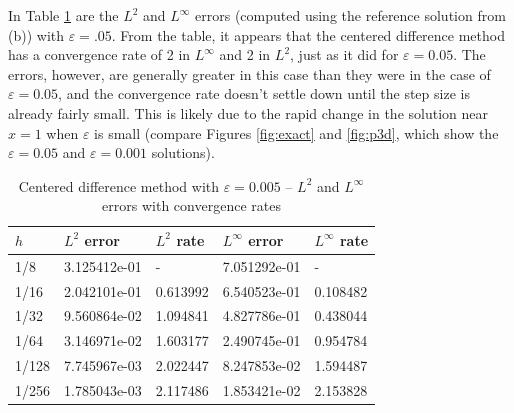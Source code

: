 \documentclass{homework}
\begin{document}
\begin{alphaparts}
		\questionpart In Table \ref{tab:p3e} are the $L^2$ and $L^\infty$ errors (computed using the reference solution from (b)) with $\varepsilon = .05$. From the table, it appears that the centered difference method has a convergence rate of 2 in $L^\infty$ and 2 in $L^2$, just as it did for $\varepsilon = 0.05$. The errors, however, are generally greater in this case than they were in the case of $\varepsilon = 0.05$, and the convergence rate doesn't settle down until the step size is already fairly small. This is likely due to the rapid change in the solution near $x =1$ when $\varepsilon$ is small (compare Figures \ref{fig:exact} and \ref{fig:p3d}, which show the $\varepsilon = 0.05$ and $\varepsilon = 0.001$ solutions).
		
		\begin{table}[h]
			\centering
			\begin{tabular}{@{}lllll@{}}
				\toprule
				$h$ & $L^2$ error & $L^2$ rate & $L^\infty$ error & $L^\infty$ rate \\
				\midrule
				1/8 & 3.125412e-01 & - & 7.051292e-01 & -\\
				1/16 & 2.042101e-01 & 0.613992 & 6.540523e-01 & 0.108482\\
				1/32 & 9.560864e-02 & 1.094841 & 4.827786e-01 & 0.438044\\
				1/64 & 3.146971e-02 & 1.603177 & 2.490745e-01 & 0.954784\\
				1/128 & 7.745967e-03 & 2.022447 & 8.247853e-02 & 1.594487\\
				1/256 & 1.785043e-03 & 2.117486 & 1.853421e-02 & 2.153828\\
				\bottomrule
			\end{tabular}
			\caption{Centered difference method with $\varepsilon = 0.005$ -- $L^2$ and $L^\infty$ errors with convergence rates}
			\label{tab:p3e}
		\end{table}
	
	\end{alphaparts}
\end{document}

